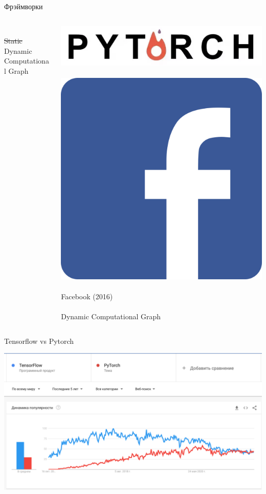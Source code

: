 \documentclass[notes,12pt, aspectratio=169]{beamer}
\begin{document}
\begin{frame}{Фрэймворки}
\begin{columns}[T]
\begin{column}{.33\textwidth}
		\mbox{ } \\
		\sout{Static}  Dynamic Computational Graph 
	\end{column}%
	\hfill%
	\begin{column}{.33\textwidth}
		\centering 	\includegraphics[width=.7\linewidth]{pytorch.png} \\
		\mbox{ } \\
		\centering 	\includegraphics[width=.3\linewidth]{facebook.png} \\
		\mbox{ } \\
		Facebook (2016) \\ 
		\mbox{ } \\
		Dynamic Computational Graph 
	\end{column}%
\end{columns}
\end{frame}


\begin{frame}{Tensorflow vs Pytorch}
\begin{center}
	\includegraphics[width=.9\linewidth]{tf_vs_pt.png}
\end{center}
\end{frame} 
\end{document}
